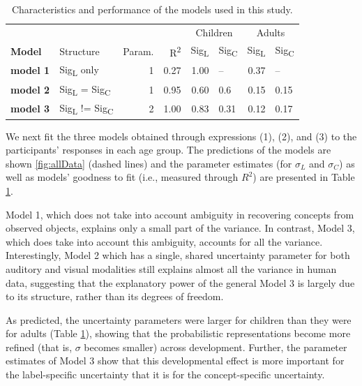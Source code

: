 \documentclass[english,,man,floatsintext]{apa6}
\theoremstyle{definition}
\theoremstyle{definition}
\theoremstyle{definition}
\theoremstyle{remark}
\begin{document}
\begin{table}

\caption{\label{tab:models}Characteristics and performance of the models used in this study.}
\centering
\begin{tabular}[t]{>{\bfseries}llrrrlrl}
\toprule
\multicolumn{1}{c}{} & \multicolumn{1}{c}{} & \multicolumn{1}{c}{} & \multicolumn{1}{c}{} & \multicolumn{2}{c}{Children} & \multicolumn{2}{c}{Adults} \\
\cmidrule(l{2pt}r{2pt}){5-6} \cmidrule(l{2pt}r{2pt}){7-8}
Model & Structure & Param. & R\textsuperscript{2} & Sig\textsubscript{L} & Sig\textsubscript{C} & Sig\textsubscript{L} & Sig\textsubscript{C}\\
\midrule
model 1 & Sig\textsubscript{L} only & 1 & 0.27 & 1.00 & -- & 0.37 & --\\
model 2 & Sig\textsubscript{L} = Sig\textsubscript{C} & 1 & 0.95 & 0.60 & 0.6 & 0.15 & 0.15\\
model 3 & Sig\textsubscript{L} != Sig\textsubscript{C} & 2 & 1.00 & 0.83 & 0.31 & 0.12 & 0.17\\
\bottomrule
\end{tabular}
\end{table}

We next fit the three models obtained through expressions (1), (2), and
(3) to the participants' responses in each age group. The predictions of
the models are shown \ref{fig:allData} (dashed lines) and the parameter
estimates (for \(\sigma_L\) and \(\sigma_C\)) as well as models'
goodness to fit (i.e., measured through \(R^2\)) are presented in Table
\ref{tab:models}.

Model 1, which does not take into account ambiguity in recovering
concepts from observed objects, explains only a small part of the
variance. In contrast, Model 3, which does take into account this
ambiguity, accounts for all the variance. Interestingly, Model 2 which
has a single, shared uncertainty parameter for both auditory and visual
modalities still explains almost all the variance in human data,
suggesting that the explanatory power of the general Model 3 is largely
due to its structure, rather than its degrees of freedom.

As predicted, the uncertainty parameters were larger for children than
they were for adults (Table \ref{tab:models}), showing that the
probabilistic representations become more refined (that is, \(\sigma\)
becomes smaller) across development. Further, the parameter estimates of
Model 3 show that this developmental effect is more important for the
label-specific uncertainty that it is for the concept-specific
uncertainty.
\end{document}
